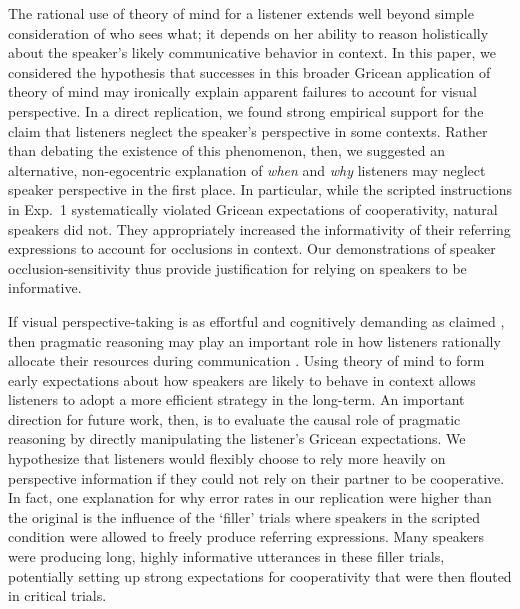 \documentclass[manuscript]{stjour}
\begin{document}
The rational use of theory of mind for a listener extends well beyond simple consideration of who sees what; it depends on her ability to reason holistically about the speaker's likely communicative behavior in context. 
In this paper, we considered the hypothesis that successes in this broader Gricean application of theory of mind may ironically explain apparent failures to account for visual perspective. 
In a direct replication, we found strong empirical support for the claim that listeners neglect the speaker's perspective in some contexts. 
Rather than debating the existence of this phenomenon, then, we suggested an alternative, non-egocentric explanation of \emph{when} and \emph{why} listeners may neglect speaker perspective in the first place. 
In particular, while the scripted instructions in Exp.~1 systematically violated Gricean expectations of cooperativity, natural speakers did not. They appropriately increased the informativity of their referring expressions to account for occlusions in context. 
Our demonstrations of speaker occlusion-sensitivity thus provide justification for relying on speakers to be informative.

If visual perspective-taking is as effortful and cognitively demanding as claimed \cite{LinKeysarEpley10_ReflexivelyMindblind}, then pragmatic reasoning may play an important role in how listeners rationally allocate their resources during communication \cite{GriffithsLiederGoodman15_LevelsOfAnalysis}. Using theory of mind to form early expectations about how speakers are likely to behave in context allows listeners to adopt a more efficient strategy in the long-term. An important direction for future work, then, is to evaluate the causal role of pragmatic reasoning by directly manipulating the listener's Gricean expectations. We hypothesize that listeners would flexibly choose to rely more heavily on perspective information if they could not rely on their partner to be cooperative. In fact, one explanation for why error rates in our replication were higher than the original is the influence of the `filler' trials where speakers in the scripted condition were allowed to freely produce referring expressions. Many speakers were producing long, highly informative utterances in these filler trials, potentially setting up strong expectations for cooperativity that were then flouted in critical trials.
\end{document}
